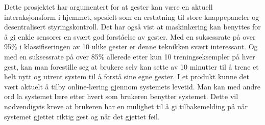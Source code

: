 Dette prosjektet har argumentert for at gester kan være en aktuell interaksjonsform i hjemmet, spesielt som en erstatning til store knappepaneler og desentralisert styringskontroll. Det har også vist at maskinlæring kan benyttes for å gi enkle sensorer en svært god forståelse av gester. Med en suksessrate på over 95\% i klassifiseringen av 10 ulike gester er denne teknikken svært interessant. Og med en suksessrate på over 85\% allerede etter kun 10 treningseksempler på hver gest, kan man forestille seg at brukere selv kan sette av 10 minutter til å trene et helt nytt og utrent system til å forstå sine egne gester. I et produkt kunne det vært aktuelt å tilby online-læring gjennom systemets levetid. Man kan med andre ord la systemet lære etter hvert som brukeren benytter systemet. Dette vil nødvendigvis kreve at brukeren har en mulighet til å gi tilbakemelding på når systemet gjettet riktig gest og når det gjettet feil.


